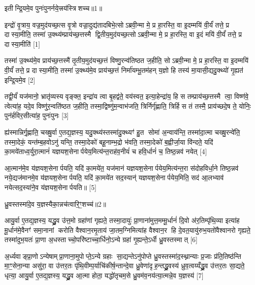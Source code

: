{\scriptsize {इतीन्द्रि॒यमे॒व पुनः॑पुनर्नये॒त्त्रय॑स्त्रिशच्च॥1॥}}

इन्द्रो॑ वृ॒त्राय॒ वज्र॒मुद॑यच्छ॒त्स वृ॒त्रो वज्रा॒दुद्य॑तादबिभे॒त्सोऽब्रवी॒न्मा मे॒ प्र हा॒रस्ति॒ वा इ॒दम्मयि॑ वी॒र्यं॑ तत्ते॒ प्र दास्या॒मीति॒ तस्मा॑ उ॒क्थ्य॑म्प्राय॑च्छ॒त्तस्मै द्वि॒तीय॒मुद॑यच्छ॒त्सोऽब्रवी॒न्मा मे॒ प्र हा॒रस्ति॒ वा इ॒दं मयि॑ वी॒र्यं॑ तत्ते॒ प्र दास्या॒मीति॑ [1]

तस्मा॑ उ॒क्थ्य॑मे॒व प्राय॑च्छ॒त्तस्मै॑ तृ॒तीय॒मुद॑यच्छ॒त्तं विष्णु॒रन्व॑तिष्ठत ज॒हीति॒ सोऽब्रवी॒न्मा मे॒ प्र हा॒रस्ति॒ वा इ॒दम्मयि॑ वी॒र्यं॑ तत्ते॒ प्र दास्या॒मीति॒ तस्मा॑ उ॒क्थ्य॑मे॒व प्राय॑च्छ॒त्तं निर्मा॑यम्भू॒तम॑हन् य॒ज्ञो हि तस्य॑ मा॒यासी॒द्यदु॒क्थ्यो॑ गृ॒ह्यत॑ इन्द्रि॒यमे॒व [2]

तद्वी॒र्यं॑ यज॑मानो॒ भ्रातृ॑व्यस्य वृङ्क्त॒ इन्द्रा॑य त्वा बृ॒हद्व॑ते॒ वय॑स्वत॒ इत्या॒हेन्द्रा॑य॒ हि स तम्प्राय॑च्छ॒त्तस्मै त्वा॒ विष्ण॑वे॒ त्वेत्या॑ह॒ यदे॒व विष्णु॑र॒न्वति॑ष्ठत ज॒हीति॒ तस्मा॒द्विष्णु॑म॒न्वाभ॑जति॒ त्रिर्निर्गृ॑ह्णाति॒ त्रिर्\mbox{}हि स तं तस्मै॒ प्राय॑च्छदे॒ष ते॒ योनिः॒ पुन॑र्\mbox{}हविर॒सीत्या॑ह॒ पुनः॑पुनः [3]

ह्य॑स्मान्निर्गृ॒ह्णाति॒ चख्षु॒र्वा ए॒तद्य॒ज्ञस्य॒ यदु॒क्थ्य॑स्तस्मा॑दु॒क्थ्यꣳ॑ हु॒त सोमा॑ अ॒न्वाय॑न्ति॒ तस्मा॑दा॒त्मा चख्षु॒रन्वे॑ति॒ तस्मा॒देकं॒ यन्त॑म्ब॒हवोऽनु॑ यन्ति॒ तस्मा॒देको॑ बहू॒नाम्भ॒द्रो भ॑वति॒ तस्मा॒देको॑ ब॒ह्वीर्जा॒या वि॑न्दते॒ यदि॑ का॒मये॑ताध्व॒र्युरा॒त्मानं॑ यज्ञयश॒सेनार्पयेय॒मित्य॑न्त॒राह॑व॒नीयं॑ च हवि॒र्धानं॑ च॒ तिष्ठ॒न्नव॑ नयेत् [4]

आ॒त्मान॑मे॒व य॑ज्ञयश॒सेनार्पयति॒ यदि॑ का॒मये॑त॒ यज॑मानं यज्ञयश॒सेनार्पयेय॒मित्य॑न्त॒रा स॑दोहविर्धा॒ने तिष्ठ॒न्नव॑ नये॒द्यज॑मानमे॒व य॑ज्ञयश॒सेनार्पयति॒ यदि॑ का॒मये॑त सद॒स्यान्॑ यज्ञयश॒सेनार्पयेय॒मिति॒ सद॑ आ॒लभ्याव॑ नयेत्सद॒स्या॑ने॒व य॑ज्ञयश॒सेनार्पयति॥ [5]

{\scriptsize {ध्रु॒वस्तस्मा॑दे॒व य॒ज्ञस्यैका॒न्नच॑त्वारि॒ꣳ॒शच्च॑॥2॥}}

आयु॒र्वा ए॒तद्य॒ज्ञस्य॒ यद्ध्रु॒व उ॑त्त॒मो ग्रहा॑णां गृह्यते॒ तस्मा॒दायुः॑ प्रा॒णाना॑मुत्त॒मम्मू॒र्धानं॑ दि॒वो अ॑र॒तिम्पृ॑थि॒व्या इत्या॑ह मू॒र्धान॑मे॒वैनꣳ॑ समा॒नानां करोति वैश्वान॒रमृ॒ताय॑ जा॒तम॒ग्निमित्या॑ह वैश्वान॒र हि दे॒वत॒यायु॑रुभ॒यतो॑वैश्वानरो गृह्यते॒ तस्मा॑दुभ॒यतः॑ प्रा॒णा अ॒धस्ताच्चो॒परि॑ष्टाच्चा॒र्धिनो॒ऽन्ये ग्रहा॑ गृ॒ह्यन्ते॒ऽर्धी ध्रु॒वस्तस्मात् [6]

अ॒र्ध्यवाङ्प्रा॒णोऽन्येषाम्प्रा॒णाना॒मुपोप्ते॒ऽन्ये ग्रहाः सा॒द्यन्तेऽनु॑पोप्ते ध्रु॒वस्तस्मा॑द॒स्थ्नान्याः प्र॒जाः प्र॑ति॒तिष्ठ॑न्ति मा॒ꣳ॒सेना॒न्या असु॑रा॒ वा उ॑त्तर॒तः पृ॑थि॒वीम्प॒र्याचि॑कीर्\mbox{}ष॒न्तान्दे॒वा ध्रु॒वेणा॑दृह॒न्तद्ध्रु॒वस्य॑ ध्रुव॒त्वय्यँद्ध्रु॒व उ॑त्तर॒तः सा॒द्यते॒ धृत्या॒ आयु॒र्वा ए॒तद्य॒ज्ञस्य॒ यद्ध्रु॒व आ॒त्मा होता॒ यद्धो॑तृचम॒से ध्रु॒वम॑व॒नय॑त्या॒त्मन्ने॒व य॒ज्ञस्य॑ [7]

